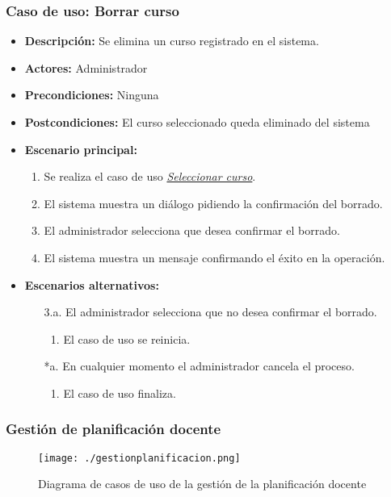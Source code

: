 \subsubsection*{Caso de uso: Borrar curso}
\begin{itemize}
\item{\bf Descripción:} Se elimina un curso registrado en el sistema.
\item{\bf Actores:} Administrador
\item{\bf Precondiciones:} Ninguna
\item{\bf Postcondiciones:} El curso seleccionado queda eliminado del sistema
\item{\bf Escenario principal:}
	\begin{enumerate}
	\item Se realiza el caso de uso {\em \hyperref[select_curso]{Seleccionar curso}}.
	\item El sistema muestra un diálogo pidiendo la confirmación del borrado.
	\item El administrador selecciona que desea confirmar el borrado.
	\item El sistema muestra un mensaje confirmando el éxito en la operación.
	\end{enumerate}
\item{\bf Escenarios alternativos:}
	\begin{itemize}
		\item[3.a.] El administrador selecciona que no desea confirmar el borrado.
		\begin{enumerate}
			\item El caso de uso se reinicia.
		\end{enumerate}
		\item[*a.] En cualquier momento el administrador cancela el proceso.
		\begin{enumerate}
			\item El caso de uso finaliza.
		\end{enumerate}
	\end{itemize}
\end{itemize}


\subsubsection{Gestión de planificación docente}
\begin{figure}[H] 
  \label{gestion-planificacion} 
	\begin{center}
    \texttt{[image: ./gestionplanificacion.png]}
  \end{center}
\caption{Diagrama de casos de uso de la gestión de la planificación docente}
\end{figure}
